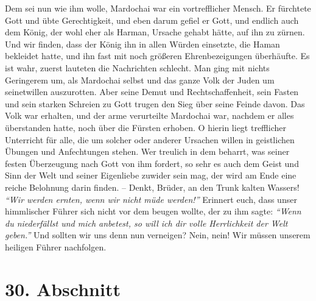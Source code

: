 Dem sei nun wie ihm wolle, Mardochai war ein vortrefflicher Mensch. Er fürchtete
Gott und übte Gerechtigkeit, und eben darum gefiel er Gott, und endlich auch dem
König, der wohl eher als Harman, Ursache gehabt hätte, auf ihn zu zürnen. Und
wir finden, dass der König ihn in allen Würden einsetzte, die Haman bekleidet
hatte, und ihn fast mit noch größeren Ehrenbezeigungen überhäufte. Es ist wahr,
zuerst lauteten die Nachrichten schlecht. Man ging mit nichts Geringerem um, als
Mardochai selbst und das ganze Volk der Juden um seinetwillen auszurotten. Aber
seine Demut und Rechtschaffenheit, sein Fasten und sein starken
Schreien zu
Gott trugen den Sieg über seine Feinde davon. Das Volk war erhalten, und der
arme
verurteilte Mardochai war, nachdem er alles überstanden hatte, noch über die
Fürsten erhoben. O hierin liegt trefflicher Unterricht für alle, die um solcher
oder anderer Ursachen willen in geistlichen Übungen und Anfechtungen stehen.
Wer treulich in dem beharrt, was seiner festen Überzeugung
nach Gott von ihm
fordert, so sehr es auch dem Geist und Sinn der
Welt und seiner Eigenliebe
zuwider sein mag, der wird am Ende eine reiche Belohnung darin
finden. -- Denkt,
Brüder, an den Trunk kalten Wassers!
\textit{"`Wir werden ernten, wenn wir nicht müde
werden!"'}
Erinnert euch, dass unser himmlischer Führer sich nicht vor dem
beugen
wollte, der zu ihm sagte:
\textit{"`Wenn du niederfällst und mich anbetest, so will ich
dir volle Herrlichkeit der Welt geben."'}
Und sollten wir
uns denn nun verneigen? Nein, nein! Wir müssen unserem heiligen Führer
nachfolgen. 

\section{30. Abschnitt} \label{kap9_ab30}

